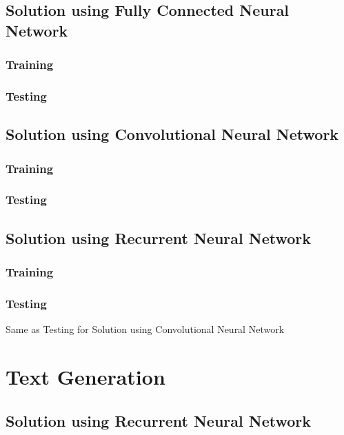 \documentclass[10pt,twoside,a4paper,openany]{memoir}
\begin{document}
\section{Solution using Fully Connected Neural Network}
\subsection{Training}


\subsection{Testing}


\newpage
\section{Solution using Convolutional Neural Network}
\subsection{Training}


\subsection{Testing}


\section{Solution using Recurrent Neural Network}
\subsection{Training}


\subsection{Testing}
Same as Testing for Solution using Convolutional Neural Network

\chapter{Text Generation}
\section{Solution using Recurrent Neural Network}
\end{document}
